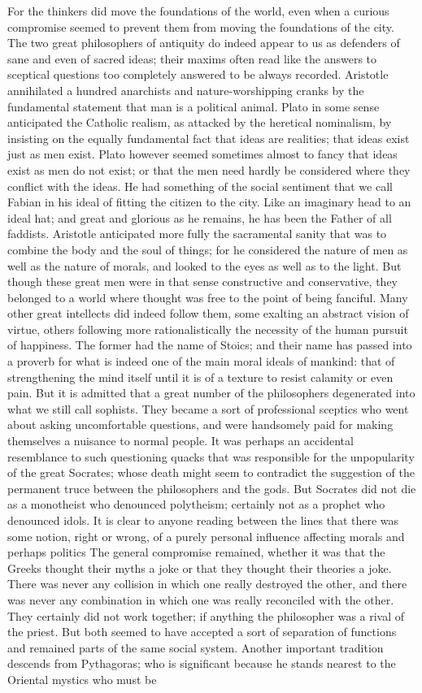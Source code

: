 For the thinkers did move the foundations of the world, even when a curious compromise seemed to prevent them from moving the foundations of the city. The two great philosophers of antiquity do indeed appear to us as defenders of sane and even of sacred ideas; their maxims often read like the answers to sceptical questions too completely answered to be always recorded. Aristotle annihilated a hundred anarchists and nature-worshipping cranks by the fundamental statement that man is a political animal. Plato in some sense anticipated the Catholic realism, as attacked by the heretical nominalism, by insisting on the equally fundamental fact that ideas are realities; that ideas exist just as men exist. Plato however seemed sometimes almost to fancy that ideas exist as men do not exist; or that the men need hardly be considered where they conflict with the ideas. He had something of the social sentiment that we call Fabian in his ideal of fitting the citizen to the city. Like an imaginary head to an ideal hat; and great and glorious as he remains, he has been the Father of all faddists. Aristotle anticipated more fully the sacramental sanity that was to combine the body and the soul of things; for he considered the nature of men as well as the nature of morals, and looked to the eyes as well as to the light. But though these great men were in that sense constructive and conservative, they belonged to a world where thought was free to the point of being fanciful. Many other great intellects did indeed follow them, some exalting an abstract vision of virtue, others following more rationalistically the necessity of the human pursuit of happiness. The former had the name of Stoics; and their name has passed into a proverb for what is indeed one of the main moral ideals of mankind: that of strengthening the mind itself until it is of a texture to resist calamity or even pain. But it is admitted that a great number of the philosophers degenerated into what we still call sophists. They became a sort of professional sceptics who went about asking uncomfortable questions, and were handsomely paid for making themselves a nuisance to normal people. It was perhaps an accidental resemblance to such questioning quacks that was responsible for the unpopularity of the great Socrates; whose death might seem to contradict the suggestion of the permanent truce between the philosophers and the gods. But Socrates did not die as a monotheist who denounced polytheism; certainly not as a prophet who denounced idols. It is clear to anyone reading between the lines that there was some notion, right or wrong, of a purely personal influence affecting morals and perhaps politics The general compromise remained, whether it was that the Greeks thought their myths a joke or that they thought their theories a joke. There was never any collision in which one really destroyed the other, and there was never any combination in which one was really reconciled with the other. They certainly did not work together; if anything the philosopher was a rival of the priest. But both seemed to have accepted a sort of separation of functions and remained parts of the same social system. Another important tradition descends from Pythagoras; who is significant because he stands nearest to the Oriental mystics who must be 